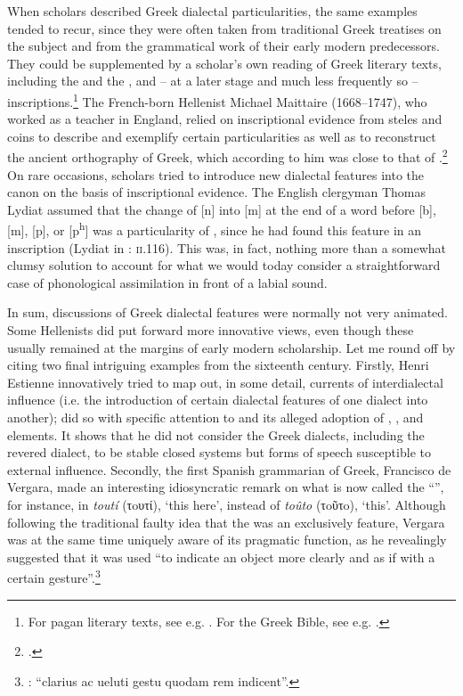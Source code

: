When scholars described Greek dialectal particularities, the same examples tended to recur, since they were often taken from traditional Greek treatises on the subject and from the grammatical work of their early modern predecessors. They could be supplemented by a scholar’s own reading of Greek literary texts, including the  and the , and – at a later stage and much less frequently so – inscriptions.\footnote{For pagan literary texts, see e.g. \citet[]{Amerot1520, Amerot1530}. For the Greek Bible, see e.g. \citet{Pasor1632}.} The French-born Hellenist Michael Maittaire (1668–1747), who worked as a teacher in England, relied on inscriptional evidence from steles and coins to describe and exemplify certain  particularities as well as to reconstruct the ancient orthography of Greek, which according to him was close to that of .\footnote{\citet[e.g. 161–167, 170, 184, 205–206, 211–212, 221, 240, 243]{Maittaire1706}.} On rare occasions, scholars tried to introduce new dialectal features into the canon on the basis of inscriptional evidence. The English clergyman Thomas Lydiat assumed that the change of [n] into [m] at the end of a word before [b], [m], [p], or [p\textsuperscript{h}] was a particularity of , since he had found this feature in an  inscription (Lydiat in \citealt{Prideaux1676}: \textsc{ii}.116). This was, in fact, nothing more than a somewhat clumsy solution to account for what we would today consider a straightforward case of phonological assimilation in front of a labial sound.

In sum, discussions of Greek dialectal features were normally not very animated. Some Hellenists did put forward more innovative views, even though these usually remained at the margins of early modern scholarship. Let me round off by citing two final intriguing examples from the sixteenth century. Firstly, Henri Estienne innovatively tried to map out, in some detail, currents of interdialectal influence (i.e. the introduction of certain dialectal features of one dialect into another); \citet[22--28]{Estienne1581} did so with specific attention to  and its alleged adoption of , , and  elements. It shows that he did not consider the Greek dialects, including the revered  dialect, to be stable closed systems but forms of speech susceptible to external influence. Secondly, the first Spanish grammarian of Greek, Francisco de Vergara, made an interesting idiosyncratic remark on what is now called the “”, for instance, in \textit{toutí} (τoυτί), ‘this here’, instead of \textit{toûto} (τoῦτo), ‘this’. Although following the traditional faulty idea that the  was an exclusively  feature, Vergara was at the same time uniquely aware of its pragmatic function, as he revealingly suggested that it was used “to indicate an object more clearly and as if with a certain gesture”.\footnote{\citet[218]{Vergara1537}: “clarius ac ueluti gestu quodam rem indicent”.}

